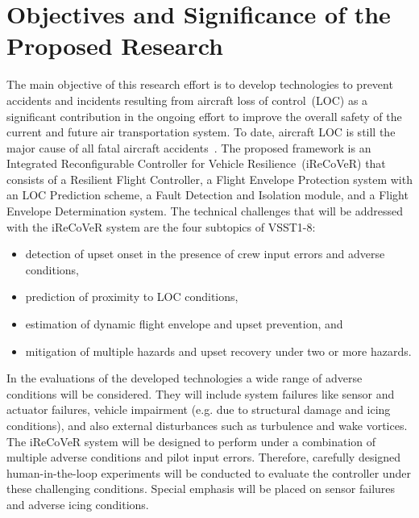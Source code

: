 \documentclass[letter,onecolumn,12pt]{aiaa-tc}
\begin{document}
\section{Objectives and Significance of the Proposed Research}

The main objective of this research effort is to develop technologies to prevent accidents and incidents resulting from aircraft loss of control~(LOC) as a significant contribution in the ongoing effort to improve the overall safety of the current and future air transportation system. To date, aircraft LOC is still the major cause of all fatal aircraft accidents~\cite{LOC04_LOCMetrics,LOC_2007,MST08_upsets,LOC_2010,LOC10_Belcastro_analysis,LOC10_Belcastro_concept}. The proposed framework is an Integrated Reconfigurable Controller for Vehicle Resilience~\mbox{(iReCoVeR)} that consists of a Resilient Flight Controller, a Flight Envelope Protection system with an LOC Prediction scheme, a Fault Detection and Isolation module, and a Flight Envelope Determination system. The technical challenges that will be addressed with the iReCoVeR system are the four subtopics of VSST1-8:
\begin{itemize}
\setlength{\itemsep}{-3pt}
\vspace{-2mm}
    \item detection of upset onset in the presence of crew input errors and adverse conditions,
    \item prediction of proximity to LOC conditions,
    \item estimation of dynamic flight envelope and upset prevention, and
    \item mitigation of multiple hazards and upset recovery under two or more hazards.
\end{itemize}
In the evaluations of the developed technologies a wide range of adverse conditions will be considered. They will include system failures like sensor and actuator failures, vehicle impairment (e.g. due to structural damage and icing conditions), and also external disturbances such as turbulence and wake vortices. The iReCoVeR system will be designed to perform under a combination of multiple adverse conditions and pilot input errors. Therefore, carefully designed human-in-the-loop experiments will be conducted to evaluate the controller under these challenging conditions. Special emphasis will be placed on sensor failures and adverse icing conditions.
\end{document}
